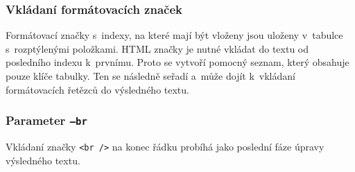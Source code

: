 \documentclass[10pt,a4paper]{article}
\begin{document}
\subsubsection{Vkládaní formátovacích značek}
Formátovací značky s~indexy, na které mají být vloženy jsou uloženy
v~tabulce s~rozptýlenými položkami. HTML značky je nutné vkládat do textu od 
posledního indexu k~prvnímu. Proto se vytvoří pomocný seznam, který obsahuje
pouze klíče tabulky. Ten se následně seřadí a~může dojít k~vkládaní
formátovacích řetězců do výsledného textu.

\subsubsection{Parameter \texttt{--br}}
Vkládaní značky \texttt{<br />} na konec řádku probíhá jako poslední fáze
úpravy výsledného textu.
\end{document}
